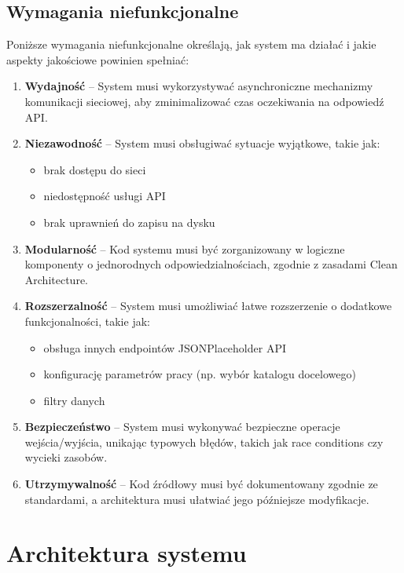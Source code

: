 \documentclass[12pt,a4paper]{article}
\begin{document}
\subsection{Wymagania niefunkcjonalne}
Poniższe wymagania niefunkcjonalne określają, jak system ma działać i jakie aspekty jakościowe powinien spełniać:

\begin{enumerate}
    \item \textbf{Wydajność} -- System musi wykorzystywać asynchroniczne mechanizmy komunikacji sieciowej, aby zminimalizować czas oczekiwania na odpowiedź API.
    
    \item \textbf{Niezawodność} -- System musi obsługiwać sytuacje wyjątkowe, takie jak:
    \begin{itemize}
        \item brak dostępu do sieci
        \item niedostępność usługi API
        \item brak uprawnień do zapisu na dysku
    \end{itemize}
    
    \item \textbf{Modularność} -- Kod systemu musi być zorganizowany w logiczne komponenty o jednorodnych odpowiedzialnościach, zgodnie z zasadami Clean Architecture.
    
    \item \textbf{Rozszerzalność} -- System musi umożliwiać łatwe rozszerzenie o dodatkowe funkcjonalności, takie jak:
    \begin{itemize}
        \item obsługa innych endpointów JSONPlaceholder API
        \item konfigurację parametrów pracy (np. wybór katalogu docelowego)
        \item filtry danych
    \end{itemize}
    
    \item \textbf{Bezpieczeństwo} -- System musi wykonywać bezpieczne operacje wejścia/wyjścia, unikając typowych błędów, takich jak race conditions czy wycieki zasobów.
    
    \item \textbf{Utrzymywalność} -- Kod źródłowy musi być dokumentowany zgodnie ze standardami, a architektura musi ułatwiać jego późniejsze modyfikacje.
\end{enumerate}

\section{Architektura systemu}
\end{document}
